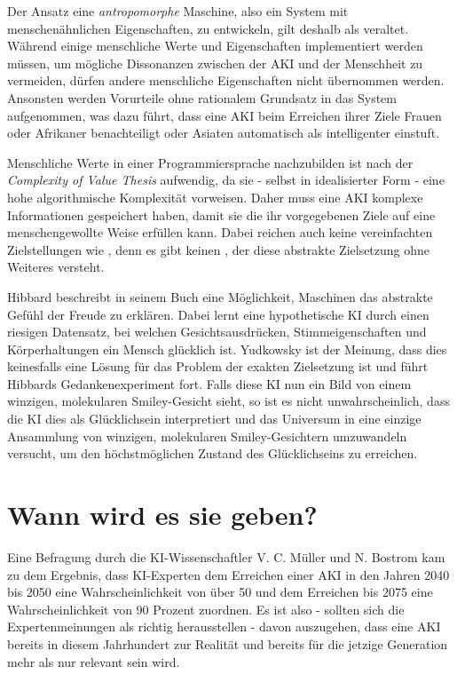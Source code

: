 Der Ansatz eine \emph{antropomorphe} Maschine, also ein System mit menschenähnlichen Eigenschaften, zu entwickeln, gilt deshalb als veraltet. Während einige menschliche Werte und Eigenschaften implementiert werden müssen, um mögliche Dissonanzen zwischen der AKI und der Menschheit zu vermeiden, dürfen andere menschliche Eigenschaften nicht übernommen werden. Ansonsten werden Vorurteile ohne rationalem Grundsatz in das System aufgenommen, was dazu führt, dass eine AKI beim Erreichen ihrer Ziele Frauen oder Afrikaner benachteiligt oder Asiaten automatisch als intelligenter einstuft.

Menschliche Werte in einer Programmiersprache nachzubilden ist nach der \emph{Complexity of Value Thesis} aufwendig, da sie - selbst in idealisierter Form - eine hohe algorithmische Komplexität vorweisen. Daher muss eine AKI komplexe Informationen gespeichert haben, damit sie die ihr vorgegebenen Ziele auf eine menschengewollte Weise erfüllen kann. Dabei reichen auch keine vereinfachten Zielstellungen wie  , denn es gibt keinen , der diese abstrakte Zielsetzung ohne Weiteres versteht.

Hibbard beschreibt in seinem Buch eine Möglichkeit, Maschinen das abstrakte Gefühl der Freude zu erklären. Dabei lernt eine hypothetische KI durch einen riesigen Datensatz, bei welchen Gesichtsausdrücken, Stimmeigenschaften und Körperhaltungen ein Mensch glücklich ist. Yudkowsky ist der Meinung, dass dies keinesfalls eine Lösung für das Problem der exakten Zielsetzung ist und führt Hibbards Gedankenexperiment fort. Falls diese KI nun ein Bild von einem winzigen, molekularen Smiley-Gesicht sieht, so ist es nicht unwahrscheinlich, dass die KI dies als Glücklichsein interpretiert und das Universum in eine einzige Ansammlung von winzigen, molekularen Smiley-Gesichtern umzuwandeln versucht, um den höchstmöglichen Zustand des Glücklichseins zu erreichen. 

\section{Wann wird es sie geben?}
Eine Befragung durch die KI-Wissenschaftler V. C. Müller und N. Bostrom kam zu dem Ergebnis, dass KI-Experten dem Erreichen einer AKI in den Jahren 2040 bis 2050 eine Wahrscheinlichkeit von über 50 und dem Erreichen bis 2075 eine Wahrscheinlichkeit von 90 Prozent zuordnen.  Es ist also - sollten sich die Expertenmeinungen als richtig herausstellen - davon auszugehen, dass eine AKI bereits in diesem Jahrhundert zur Realität und bereits für die jetzige Generation mehr als nur relevant sein wird. 

